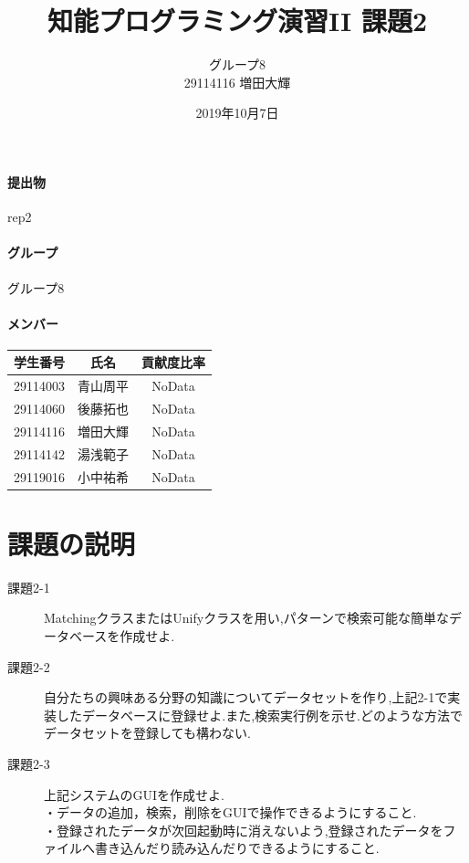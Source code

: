 \documentclass[uplatex,12pt]{jsarticle}
\title{知能プログラミング演習II 課題2}
\author{グループ8\\
  29114116 増田大輝\\
}
\date{2019年10月7日}
\begin{document}
\maketitle

\paragraph{提出物} rep2
\paragraph{グループ} グループ8

\paragraph{メンバー}
\begin{tabular}{|c|c|c|}
  \hline
  学生番号&氏名&貢献度比率\\
  \hline\hline
  29114003&青山周平&NoData\\
  \hline
  29114060&後藤拓也&NoData\\
  \hline
  29114116&増田大輝&NoData\\
  \hline
  29114142&湯浅範子&NoData\\
  \hline
  29119016&小中祐希&NoData\\
  \hline
\end{tabular}



\section{課題の説明}
\begin{description}
\item[課題2-1] MatchingクラスまたはUnifyクラスを用い,パターンで検索可能な簡単なデータベースを作成せよ.
\item[課題2-2] 自分たちの興味ある分野の知識についてデータセットを作り,上記2-1で実装したデータベースに登録せよ.また,検索実行例を示せ.どのような方法でデータセットを登録しても構わない.
\item[課題2-3] 上記システムのGUIを作成せよ. \\
・データの追加，検索，削除をGUIで操作できるようにすること. \\
・登録されたデータが次回起動時に消えないよう,登録されたデータをファイルへ書き込んだり読み込んだりできるようにすること.
\end{description}
\end{document}
